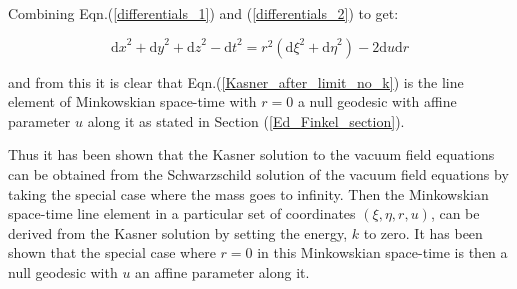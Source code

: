 \noindent Combining Eqn.(\ref{differentials_1}) and (\ref{differentials_2}) to get:

\begin{equation*}
{\mathrm{d}x}^2 + {\mathrm{d}y}^2 + {\mathrm{d}z}^2 - {\mathrm{d}t}^2 = r^2 ({\mathrm{d}\xi}^2 + {\mathrm{d}\eta}^2) - 2 {\mathrm{d}u}{\mathrm{d}r}
\end{equation*}

\noindent and from this it is clear that Eqn.(\ref{Kasner_after_limit_no_k}) is the line element of Minkowskian space-time with $r = 0$ a null geodesic with affine parameter $u$ along it as stated in Section (\ref{Ed_Finkel_section}).

Thus it has been shown that the Kasner solution to the vacuum field equations can be obtained from the Schwarzschild solution of the vacuum field equations by taking the special case where the mass goes to infinity. Then the Minkowskian space-time line element in a particular set of coordinates $(\xi, \eta, r, u)$, can be derived from the Kasner solution by setting the energy, $k$ to zero. It has been shown that the special case where $r=0$ in this Minkowskian space-time is then a null geodesic with $u$ an affine parameter along it.  
